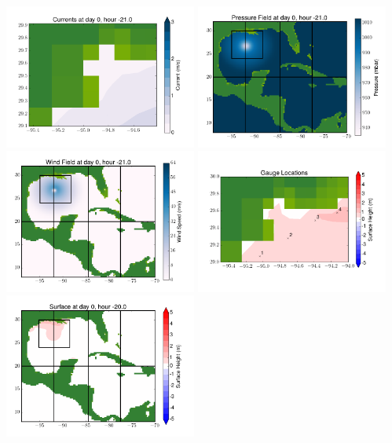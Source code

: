\documentclass[11pt]{article}
\begin{document}
\vskip 10pt 
\includegraphics[width=0.475\textwidth]{frame0051fig7.png}
\includegraphics[width=0.475\textwidth]{frame0051fig8.png}
\vskip 10pt 
\includegraphics[width=0.475\textwidth]{frame0051fig9.png}
\includegraphics[width=0.475\textwidth]{frame0051fig10.png}
\vskip 10pt 
\includegraphics[width=0.475\textwidth]{frame0052fig1.png}
\end{document}
